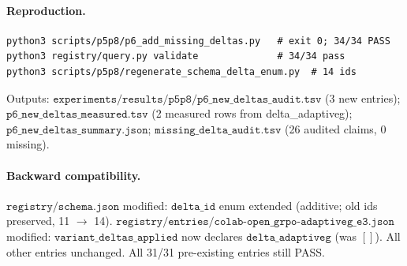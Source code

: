 \paragraph{Reproduction.}
\begin{verbatim}
python3 scripts/p5p8/p6_add_missing_deltas.py   # exit 0; 34/34 PASS
python3 registry/query.py validate              # 34/34 pass
python3 scripts/p5p8/regenerate_schema_delta_enum.py  # 14 ids
\end{verbatim}
Outputs: $\texttt{experiments/results/p5p8/p6\_new\_deltas\_audit.tsv}$
(3 new entries); $\texttt{p6\_new\_deltas\_measured.tsv}$ (2 measured
rows from delta\_adaptiveg); $\texttt{p6\_new\_deltas\_summary.json}$;
$\texttt{missing\_delta\_audit.tsv}$ (26 audited claims, 0 missing).

\paragraph{Backward compatibility.}
$\texttt{registry/schema.json}$ modified: $\texttt{delta\_id}$ enum
extended (additive; old ids preserved, 11 $\to$ 14).
$\texttt{registry/entries/colab-open\_grpo-adaptiveg\_e3.json}$
modified: $\texttt{variant\_deltas\_applied}$ now declares
$\texttt{delta\_adaptiveg}$ (was $[]$). All other entries unchanged.
All 31/31 pre-existing entries still PASS.
